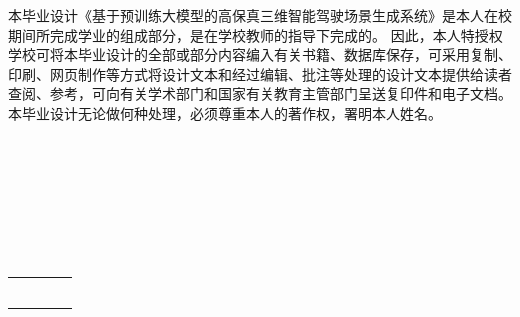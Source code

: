 
\begin{authorizationzh}
	
本毕业设计《基于预训练大模型的高保真三维智能驾驶场景生成系统》是本人在校期间所完成学业的组成部分，是在学校教师的指导下完成的。
因此，本人特授权学校可将本毕业设计的全部或部分内容编入有关书籍、数据库保存，可采用复制、印刷、网页制作等方式将设计文本和经过编辑、批注等处理的设计文本提供给读者查阅、参考，可向有关学术部门和国家有关教育主管部门呈送复印件和电子文档。
本毕业设计无论做何种处理，必须尊重本人的著作权，署明本人姓名。
\\
\\
\\
\\
\\
\\
\\
\\

	
	\vspace{30pt}
	\begin{tabular}{llll}
		\makebox[4em][s]{设计作者（签字）} & \makebox[150pt][c]{  } & \makebox[2em][s]{时间} & \makebox[100pt][c]{\qquad 年\quad 月\quad   日 }\\
		\\ \\ \\
		\makebox[4em][s]{指导教师已阅（签字）} & \makebox[150pt][c]{  } & \makebox[2em][s]{时间} & \makebox[100pt][c]{\qquad 年\quad 月\quad   日 }\\
	\end{tabular}

	
	
\end{authorizationzh}